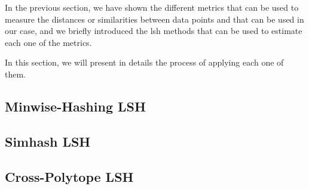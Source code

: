 In the previous section, we have shown the different metrics that can be used to
measure the distances or similarities between data points and that can be used
in our case, and we briefly introduced the \acrshort{lsh} methods that can be
used to estimate each one of the metrics. 

In this section, we will present in
details the process of applying each one of them.
\subsection{Minwise-Hashing LSH}
\label{subsect:minhash_lsh}


\subsection{Simhash LSH}
\label{subsect:simhash_lsh}


\subsection{Cross-Polytope LSH}
\label{subsect:crosspolytope_lsh}


